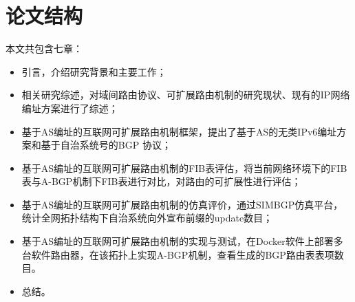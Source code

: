 \section{论文结构}
本文共包含七章：
\begin{itemize}
\item 引言，介绍研究背景和主要工作；
\item 相关研究综述，对域间路由协议、可扩展路由机制的研究现状、现有的IP网络编址方案进行了综述；
\item 基于AS编址的互联网可扩展路由机制框架，提出了基于AS的无类IPv6编址方案和基于自治系统号的BGP 协议；
\item 基于AS编址的互联网可扩展路由机制的FIB表评估，将当前网络环境下的FIB表与A-BGP机制下FIB表进行对比，对路由的可扩展性进行评估；
\item 基于AS编址的互联网可扩展路由机制的仿真评价，通过SIMBGP仿真平台，统计全网拓扑结构下自治系统向外宣布前缀的update数目；
\item 基于AS编址的互联网可扩展路由机制的实现与测试，在Docker软件上部署多台软件路由器，在该拓扑上实现A-BGP机制，查看生成的BGP路由表表项数目。
\item 总结。
\end{itemize}
